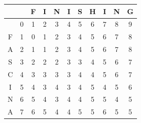 \begin{table}
	\begin{center}
		\begin{tabular}[c]{c|c|c|c|c|c|c|c|c|c|c|}
			  &                      & F                     & I                     & N                     & I                     & S                     & H                     & I                    & N                    & G                    \\\hline
			  & \cellcolor{blue!25}0 & 1                     & 2                     & 3                     & 4                     & 5                     & 6                     & 7                    & 8                    & 9                    \\\hline
			F & 1                    & \cellcolor{blue!25}0  & \cellcolor{green!25}1 & \cellcolor{green!25}2 & \cellcolor{green!25}3 & \cellcolor{green!25}4 & \cellcolor{green!25}5 & 6                    & 7                    & 8                    \\\hline
			A & 2                    & \cellcolor{green!25}1 & \cellcolor{blue!25}1  & \cellcolor{green!25}2 & \cellcolor{green!25}3 & \cellcolor{green!25}4 & \cellcolor{green!25}5 & 6                    & 7                    & 8                    \\\hline
			S & 3                    & \cellcolor{green!25}2 & \cellcolor{green!25}2 & \cellcolor{blue!25}2  & \cellcolor{green!25}3 & \cellcolor{green!25}3 & \cellcolor{green!25}4 & 5                    & 6                    & 7                    \\\hline
			C & 4                    & \cellcolor{green!25}3 & \cellcolor{green!25}3 & \cellcolor{blue!25}3  & \cellcolor{green!25}3 & \cellcolor{green!25}4 & \cellcolor{green!25}4 & 5                    & 6                    & 7                    \\\hline
			I & 5                    & \cellcolor{green!25}4 & \cellcolor{green!25}3 & \cellcolor{green!25}4 & \cellcolor{blue!25}3  & \cellcolor{green!25}4 & \cellcolor{green!25}5 & 4                    & 5                    & 6                    \\\hline
			N & 6                    & \cellcolor{green!25}5 & \cellcolor{green!25}4 & \cellcolor{green!25}3 & \cellcolor{green!25}4 & \cellcolor{blue!25}4  & \cellcolor{green!25}5 & 5                    & 4                    & 5                    \\\hline
			A & 7                    & \cellcolor{green!25}6 & \cellcolor{green!25}5 & \cellcolor{green!25}4 & \cellcolor{green!25}4 & \cellcolor{green!25}5 & \cellcolor{blue!25}5  & 6                    & 5                    & 5                    \\\hline

\end{tabular}
\end{center}
\end{table}
